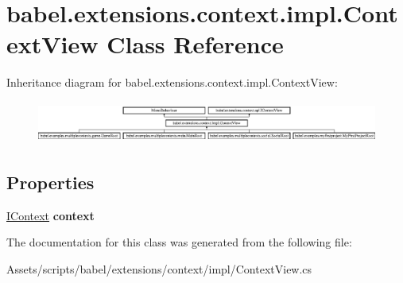 \hypertarget{classbabel_1_1extensions_1_1context_1_1impl_1_1_context_view}{\section{babel.\-extensions.\-context.\-impl.\-Context\-View Class Reference}
\label{classbabel_1_1extensions_1_1context_1_1impl_1_1_context_view}
}
Inheritance diagram for babel.\-extensions.\-context.\-impl.\-Context\-View\-:\begin{figure}[H]
\begin{center}
\leavevmode
\includegraphics[height=1.400000cm]{classbabel_1_1extensions_1_1context_1_1impl_1_1_context_view}
\end{center}
\end{figure}
\subsection*{Properties}
\begin{DoxyCompactItemize}
\item 
\hypertarget{classbabel_1_1extensions_1_1context_1_1impl_1_1_context_view_a37b6b0fe69abb70efdfa957bffeb8045}{\hyperlink{interfacebabel_1_1extensions_1_1context_1_1api_1_1_i_context}{I\-Context} {\bfseries context}}\label{classbabel_1_1extensions_1_1context_1_1impl_1_1_context_view_a37b6b0fe69abb70efdfa957bffeb8045}

\end{DoxyCompactItemize}


The documentation for this class was generated from the following file\-:\begin{DoxyCompactItemize}
\item 
Assets/scripts/babel/extensions/context/impl/Context\-View.\-cs\end{DoxyCompactItemize}
